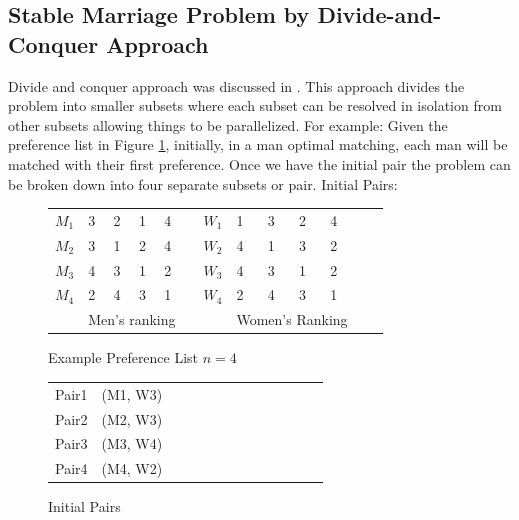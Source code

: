 \subsection{Stable Marriage Problem by Divide-and-Conquer Approach}

Divide and conquer approach was discussed in \cite{tseng1984parallel}. This approach divides the problem into smaller subsets where each subset can be resolved in isolation from other subsets allowing things to be parallelized. For example:
Given the preference list in Figure \ref{fig:parallel_example_case}, initially, in a man optimal matching, each man will be matched with their first preference. Once we have the initial pair the problem can be broken down into four separate subsets or pair. 
Initial Pairs:

\begin{figure}[!ht]
    \centering
    
    \begin{tabular}{lllllllllllll}
$M_1$ & 3     & 2    & 1    & 4       &  & $W_1$ & 1     & 3     & 2     & 4  \\
$M_2$ & 3     & 1    & 2    & 4       &  & $W_2$ & 4     & 1     & 3     & 2  \\
$M_3$ & 4     & 3    & 1    & 2       &  & $W_3$ & 4     & 3     & 1     & 2  \\
$M_4$ & 2     & 4    & 3    & 1       &  & $W_4$ & 2     & 4     & 3    & 1 \\
   & \multicolumn{4}{l}{Men's ranking} &  &    & \multicolumn{4}{l}{Women's Ranking}
\end{tabular}
    
    \caption{Example Preference List $n=4$}
    \label{fig:parallel_example_case}
\end{figure}

\begin{figure}[!ht]
    \centering
    
    \begin{tabular}{lllllllllllll}
Pair1 & (M1, W3)  \\
Pair2 & (M2, W3)  \\
Pair3 & (M3, W4)  \\
Pair4 & (M4, W2)  \\
\end{tabular}
    
    \caption{Initial Pairs}
    \label{fig:Initial Pairs}
\end{figure}

